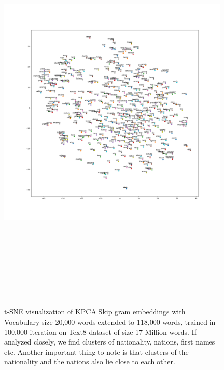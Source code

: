 \begin{figure}[H]
	\hskip-2cm
	\includegraphics[width=20cm,height=20cm,keepaspectratio]{files/enText8-20kExtendedVocab/tsne.png}
	\caption{t-SNE visualization of KPCA Skip gram embeddings with Vocabulary size 20,000 words extended to 118,000 words, trained in 100,000 iteration on Text8 dataset of size 17 Million words. If analyzed closely, we find clusters of nationality, nations, first names etc. Another important thing to note is that clusters of the nationality and the nations also lie close to each other. }
	\label{fig:tsnee3}
\end{figure}

